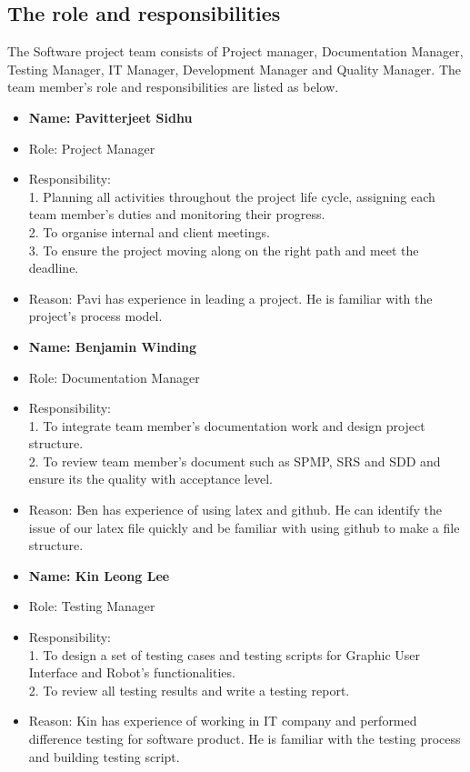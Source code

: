 \subsection{The role and responsibilities}
The Software project team consists of Project manager, Documentation Manager, Testing Manager, IT Manager, Development Manager and Quality Manager. The team member’s role and responsibilities are listed as below.

\begin{itemize}
\item \textbf{Name: Pavitterjeet Sidhu}
\item Role: Project Manager
\item Responsibility: \\
1.	Planning all activities throughout the project life cycle, assigning each team member’s duties and monitoring their progress.\\
2.	To organise internal and client meetings.\\
3.	To ensure the project moving along on the right path and meet the deadline.
\item Reason:
Pavi has experience in leading a project. He is familiar with the project’s process model.
\end{itemize}

\begin{itemize}
\item \textbf{Name: Benjamin Winding}
\item Role: Documentation Manager
\item Responsibility:\\
1.	To integrate team member’s documentation work and design project structure.\\
2.	To review team member’s document such as SPMP, SRS and SDD and ensure its the quality with acceptance level.
\item Reason:
Ben has experience of using latex and github. He can identify the issue of our latex file quickly and be familiar with using github to make a file structure.
\end{itemize}

\begin{itemize}
\item \textbf{Name: Kin Leong Lee}
\item Role: Testing Manager
\item Responsibility:\\
1.	To design a set of testing cases and testing scripts for Graphic User Interface and Robot’s functionalities.\\
2.	To review all testing results and write a testing report.
\item Reason:
Kin has experience of working in IT company and performed difference testing for software product. He is familiar with the testing process and building testing script.
\end{itemize}

